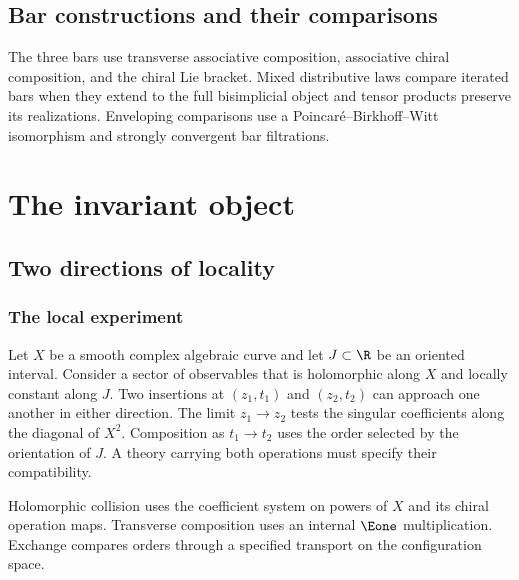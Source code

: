 \cleardoublepage
{}
{}
\chapter*{Bar constructions and their comparisons}
\begin{summarybox}
The three bars use transverse associative composition, associative chiral
composition, and the chiral Lie bracket. Mixed distributive laws compare
iterated bars when they extend to the full bisimplicial object and tensor
products preserve its realizations. Enveloping comparisons use a
Poincar\'e--Birkhoff--Witt isomorphism and strongly convergent bar filtrations.
\end{summarybox}
\part{The invariant object}

\chapter{Two directions of locality}
\section{The local experiment}
Let $X$ be a smooth complex algebraic curve and let $J\subset\R$ be an
oriented interval. Consider a sector of observables that is holomorphic
along $X$ and locally constant along $J$. Two insertions at $(z_1,t_1)$
and $(z_2,t_2)$ can approach one another in either direction. The limit
$z_1\to z_2$ tests the singular coefficients along the diagonal of $X^2$.
Composition as $t_1\to t_2$ uses the order selected by the orientation
of $J$. A theory carrying both operations must specify their compatibility.

\begin{principle}
\label{cbc:loc:two-directions}
Holomorphic collision uses the coefficient system on powers of $X$ and
its chiral operation maps. Transverse composition uses an internal
$\Eone$ multiplication. Exchange compares orders through a specified
transport on the configuration space.
\end{principle}

